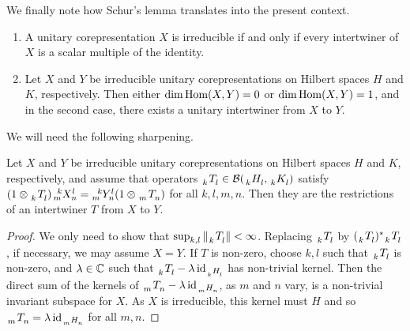 We finally note how  Schur's lemma translates into the present context. %
\begin{Cor} \label{lem:schur}
  \begin{enumerate}
  \item   A unitary corepresentation $X$ is irreducible if and only if every
  intertwiner of $X$ is a scalar multiple of the identity.
\item Let $X$ and $Y$ be irreducible unitary corepresentations on Hilbert spaces $H$ and $K$,
  respectively.  Then either $\dim \operatorname{Hom}(X,Y) = 0$ or $\dim\operatorname{Hom}(X,Y)=1$, and in the second case,
  there exists a unitary intertwiner from $X$ to $Y$.
  \end{enumerate}
\end{Cor}

We will need the following sharpening. %
\begin{Lem} \label{lem:schur-algebraic}
  Let $X$ and $Y$ be irreducible unitary corepresentations on Hilbert spaces $H$ and $K$,
  respectively, and assume that operators $ \Grd{T}{k}{l} \in
  \mathcal{B}(\Grd{H}{k}{l},\Grd{K}{k}{l}) $ satisfy $(1 \otimes \Grd{T}{k}{l})\Gr{X}{k}{l}{m}{n} =
  \Gr{Y}{k}{l}{m}{n}(1\otimes \Grd{T}{m}{n})$ for all $k,l,m,n$. Then they are the restrictions of
  an intertwiner $T$ from $X$ to $Y$. 
\end{Lem}
\begin{proof}
  We only need to show that $\sup_{k,l} \|\Grd{T}{k}{l}\|<\infty$. Replacing $\Grd{T}{k}{l}$ by
  $(\Grd{T}{k}{l})^{*}\Grd{T}{k}{l}$, if necessary, we may assume $X=Y$. If $T$ is non-zero, choose $k,l$ such that $\Grd{T}{k}{l}$ is  non-zero,  and $\lambda \in \mathbb{C}$ such that $\Grd{T}{k}{l}-\lambda \id_{\Grd{H}{k}{l}}$ has non-trivial kernel. Then the direct sum of the kernels of $\Grd{T}{m}{n} - \lambda \id_{\Grd{H}{m}{n}}$, as $m$ and $n$ vary, is  a non-trivial invariant subspace for $X$.  As $X$ is irreducible, this kernel must $H$ and so $\Grd{T}{m}{n} = \lambda \id_{\Grd{H}{m}{n}}$ for all $m,n$.
\end{proof}


